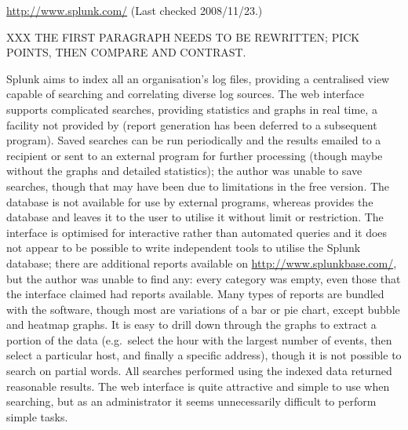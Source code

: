 \noindent{}\url{http://www.splunk.com/} \newline{}
(Last checked 2008/11/23.)

XXX THE FIRST PARAGRAPH NEEDS TO BE REWRITTEN\@; PICK POINTS, THEN COMPARE
AND CONTRAST\@.

Splunk aims to index all an organisation's log files, providing a
centralised view capable of searching and correlating diverse log sources.
The web interface supports complicated searches, providing statistics and
graphs in real time, a facility not provided by \parsername{} (report
generation has been deferred to a subsequent program).  Saved searches can
be run periodically and the results emailed to a recipient or sent to an
external program for further processing (though maybe without the graphs
and detailed statistics); the author was unable to save searches, though
that may have been due to limitations in the free version.  The database is
not available for use by external programs, whereas \parsername{} provides
the database and leaves it to the user to utilise it without limit or
restriction.  The interface is optimised for interactive rather than
automated queries and it does not appear to be possible to write
independent tools to utilise the Splunk database; there are additional
reports available on \url{http://www.splunkbase.com/}, but the author was
unable to find any: every category was empty, even those that the interface
claimed had reports available.  Many types of reports are bundled with the
software, though most are variations of a bar or pie chart, except bubble
and heatmap graphs.  It is easy to drill down through the graphs to extract
a portion of the data (e.g.\ select the hour with the largest number of
events, then select a particular host, and finally a specific address),
though it is not possible to search on partial words.  All searches
performed using the indexed data returned reasonable results.  The web
interface is quite attractive and simple to use when searching, but as an
administrator it seems unnecessarily difficult to perform simple tasks.

